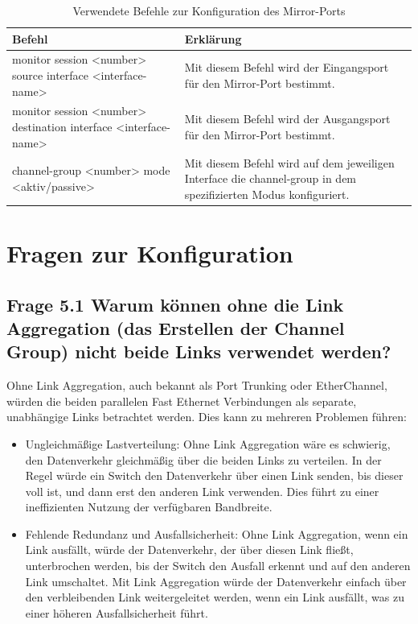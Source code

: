 \documentclass{article}
\begin{document}
\begin{table}[htbp]
    \centering
    \begin{tabularx}{\textwidth}{|X|X|}
        \toprule
        \textbf{Befehl} & \textbf{Erklärung} \\
        \midrule
        monitor session <number> source interface <interface-name> & Mit diesem Befehl wird der Eingangsport für den Mirror-Port bestimmt.\\
        \hline
        monitor session <number> destination interface <interface-name> & Mit diesem Befehl wird der Ausgangsport für den Mirror-Port bestimmt.\\
        \hline
        channel-group <number> mode <aktiv/passive> & Mit diesem Befehl wird auf dem jeweiligen Interface die channel-group in dem spezifizierten Modus konfiguriert.\\
        \bottomrule
    \end{tabularx}
    \caption{Verwendete Befehle zur Konfiguration des Mirror-Ports}
    \label{tab:commands}
\end{table}


\section{Fragen zur Konfiguration}

\subsection*{Frage 5.1 \normalfont Warum können ohne die Link Aggregation (das Erstellen der Channel Group) nicht beide Links verwendet werden?}
Ohne Link Aggregation, auch bekannt als Port Trunking oder EtherChannel, würden die beiden parallelen Fast Ethernet Verbindungen als separate, unabhängige Links betrachtet werden. Dies kann zu mehreren Problemen führen:
\begin{itemize}
  \item Ungleichmäßige Lastverteilung: Ohne Link Aggregation wäre es schwierig, den Datenverkehr gleichmäßig über die beiden Links zu verteilen. In der Regel würde ein Switch den Datenverkehr über einen Link senden, bis dieser voll ist, und dann erst den anderen Link verwenden. Dies führt zu einer ineffizienten Nutzung der verfügbaren Bandbreite.\\

  \item Fehlende Redundanz und Ausfallsicherheit: Ohne Link Aggregation, wenn ein Link ausfällt, würde der Datenverkehr, der über diesen Link fließt, unterbrochen werden, bis der Switch den Ausfall erkennt und auf den anderen Link umschaltet. Mit Link Aggregation würde der Datenverkehr einfach über den verbleibenden Link weitergeleitet werden, wenn ein Link ausfällt, was zu einer höheren Ausfallsicherheit führt.\\
\end{itemize}
\end{document}
